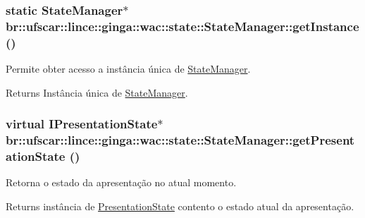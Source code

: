 \hypertarget{classbr_1_1ufscar_1_1lince_1_1ginga_1_1wac_1_1state_1_1StateManager_a7875cddb02bd5dfa72539234438b3a7e}{
\subsubsection[{getInstance}]{\setlength{\rightskip}{0pt plus 5cm}static {\bf StateManager}$\ast$ br::ufscar::lince::ginga::wac::state::StateManager::getInstance ()}}
\label{classbr_1_1ufscar_1_1lince_1_1ginga_1_1wac_1_1state_1_1StateManager_a7875cddb02bd5dfa72539234438b3a7e}


Permite obter acesso a instância única de \hyperlink{classbr_1_1ufscar_1_1lince_1_1ginga_1_1wac_1_1state_1_1StateManager}{StateManager}. 

\begin{DoxyReturn}{Returns}
Instância única de \hyperlink{classbr_1_1ufscar_1_1lince_1_1ginga_1_1wac_1_1state_1_1StateManager}{StateManager}. 
\end{DoxyReturn}
\hypertarget{classbr_1_1ufscar_1_1lince_1_1ginga_1_1wac_1_1state_1_1StateManager_affbdaf15d59f7df0aa182944818c3ad8}{
\subsubsection[{getPresentationState}]{\setlength{\rightskip}{0pt plus 5cm}virtual {\bf IPresentationState}$\ast$ br::ufscar::lince::ginga::wac::state::StateManager::getPresentationState ()}}
\label{classbr_1_1ufscar_1_1lince_1_1ginga_1_1wac_1_1state_1_1StateManager_affbdaf15d59f7df0aa182944818c3ad8}


Retorna o estado da apresentação no atual momento. 

\begin{DoxyReturn}{Returns}
instância de \hyperlink{classbr_1_1ufscar_1_1lince_1_1ginga_1_1wac_1_1state_1_1PresentationState}{PresentationState} contento o estado atual da apresentação. 
\end{DoxyReturn}



